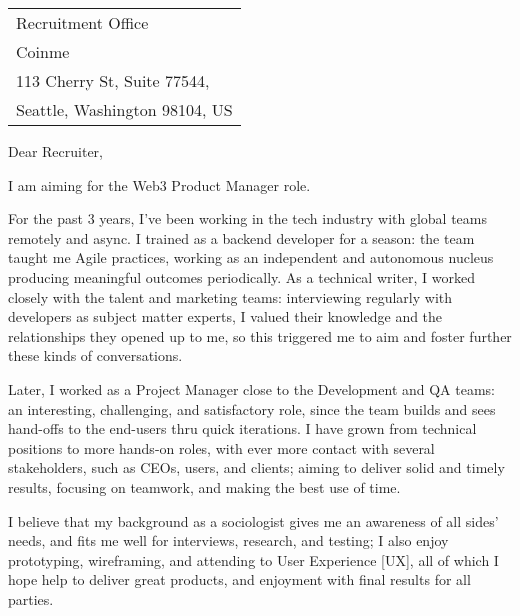 \begin{tabular}{@{} l}
    Recruitment Office \\
    Coinme \\
    113 Cherry St, Suite 77544, \\
    Seattle, Washington 98104, US
\end{tabular}

\bigskip %


Dear Recruiter,
\bigskip %


I am aiming for the Web3 Product Manager role.


For the past 3 years, I've been working in the tech industry with global teams remotely and async. 
I trained as a backend developer for a season: 
the team taught me Agile practices, working as an independent and autonomous nucleus
producing meaningful outcomes periodically.
As a technical writer, I worked closely with the talent and marketing teams:
interviewing regularly with developers as subject matter experts,
I valued their knowledge and the relationships they opened up to me,
so this triggered me to aim and foster further these kinds of conversations.

Later, I worked as a Project Manager close to the Development and QA teams:
an interesting, challenging, and satisfactory role, 
since the team builds and sees 
hand-offs to the end-users thru quick iterations.
I have grown from technical positions to more hands-on roles, with ever more contact 
with several stakeholders, such as CEOs, users, and clients; 
aiming to deliver solid and timely results, 
focusing on teamwork, 
and making the best use of time.

I believe that my background 
as a sociologist gives me an awareness of all sides' needs, 
and fits me well for interviews, research, and testing;
I also enjoy prototyping, wireframing, and attending to User Experience [UX], 
all of which I hope help to deliver great products, and enjoyment with final results for all parties.

